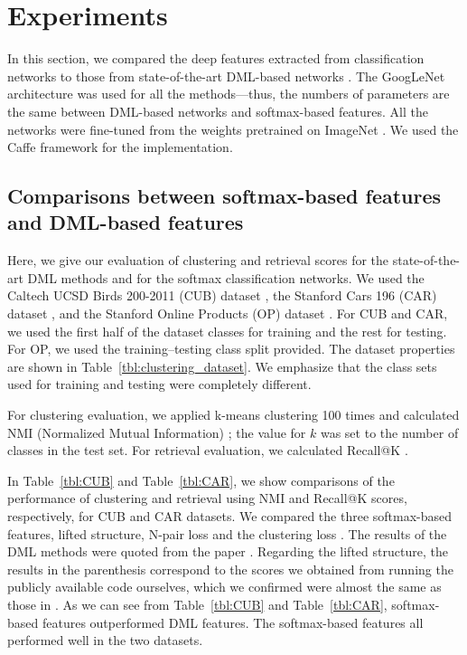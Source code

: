 \documentclass[9pt,technote,compsoc]{./sty/IEEEtran}
\newcommand{\Tref}[1]{Table~\ref{#1}}
\begin{document}
\section{Experiments}

In this section, we compared the deep features extracted from classification networks to those from state-of-the-art DML-based networks \cite{song2016deep}\cite{sohn2016improved}\cite{song2017learnable}.
The GoogLeNet architecture \cite{szegedy2015going} was used for all the methods---thus, the numbers of parameters are the same between DML-based networks and softmax-based features.
All the networks were fine-tuned from the weights pretrained on ImageNet \cite{russakovsky2015imagenet}.
We used the Caffe \cite{jia2014caffe} framework for the implementation.

\subsection{Comparisons between softmax-based features and DML-based features}
\label{sec:clustering}

Here, we give our evaluation of clustering and retrieval scores for the state-of-the-art DML methods \cite{song2016deep}\cite{sohn2016improved}\cite{song2017learnable} and for the softmax classification networks.
We used the Caltech UCSD Birds 200-2011 (CUB) dataset \cite{wah2011caltech}, the Stanford Cars 196 (CAR) dataset \cite{krause20133d}, and the Stanford Online Products (OP) dataset \cite{song2016deep}.
For CUB and CAR, we used the first half of the dataset classes for training and the rest for testing.
For OP, we used the training--testing class split provided.
The dataset properties are shown in \Tref{tbl:clustering_dataset}.
We emphasize that the class sets used for training and testing were completely different.

For clustering evaluation, we applied k-means clustering 100 times and calculated
NMI (Normalized Mutual Information) \cite{manning2009introduction}; the value for $k$ was set to the number of classes in the test set.
For retrieval evaluation, we calculated Recall@K \cite{jegou2011product}.


In \Tref{tbl:CUB} and \Tref{tbl:CAR}, we show comparisons of the performance of clustering and retrieval using NMI and Recall@K scores, respectively, for CUB and CAR datasets. We compared the three softmax-based features, lifted structure\cite{song2016deep}, N-pair loss \cite{sohn2016improved} and the clustering loss \cite{song2017learnable}.
The results of the DML methods were quoted from the paper \cite{song2017learnable}.
Regarding  the lifted structure\cite{song2016deep}, the results in the parenthesis correspond to the scores
we obtained from running the publicly available code ourselves, which we confirmed were almost the same as those in \cite{song2017learnable}.
As we can see from \Tref{tbl:CUB} and \Tref{tbl:CAR}, softmax-based features outperformed DML features.
The softmax-based features all performed well in the two datasets.
\end{document}
